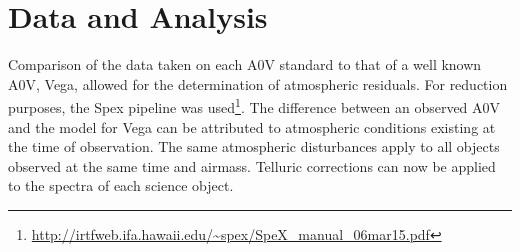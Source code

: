 \section{Data and Analysis}

Comparison of the data taken on each A0V standard to that of a well known A0V, Vega, allowed for the determination of atmospheric residuals.  %
For reduction purposes, the Spex pipeline was used\footnote{\url{http://irtfweb.ifa.hawaii.edu/~spex/SpeX_manual_06mar15.pdf}}.  The difference between an observed A0V and the model for Vega can be attributed to atmospheric conditions existing at the time of observation.  The same atmospheric disturbances apply to all objects observed at the same time and airmass. Telluric corrections can now be applied to the spectra of each science object. \cite{Cushing_2004}